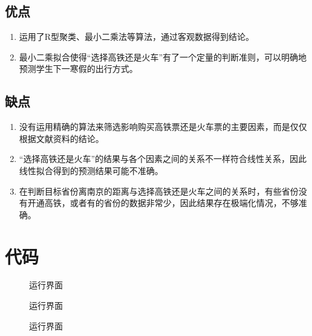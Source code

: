 \documentclass{ctexart}
\newcounter{sub}
\begin{document}
\subsection{优点}%
\label{sub:优点}
\begin{enumerate}
	\item 运用了R型聚类、最小二乘法等算法，通过客观数据得到结论。
	\item 最小二乘拟合使得\enquote{选择高铁还是火车}有了一个定量的判断准则，可以明确地预测学生下一寒假的出行方式。
\end{enumerate}

\subsection{缺点}%
\label{sub:缺点}
\begin{enumerate}
	\item 没有运用精确的算法来筛选影响购买高铁票还是火车票的主要因素，而是仅仅根据文献资料的结论。
	\item \enquote{选择高铁还是火车}的结果与各个因素之间的关系不一样符合线性关系，因此线性拟合得到的预测结果可能不准确。
	\item 在判断目标省份离南京的距离与选择高铁还是火车之间的关系时，有些省份没有开通高铁，或者有的省份的数据非常少，因此结果存在极端化情况，不够准确。
\end{enumerate}

\newpage






\renewcommand{\thesection}{\Alph{section}~}

\appendix

\section{代码}%
\label{sec:代码}


\begin{figure}[htpb]
	\centering
	\caption{运行界面}
	\label{fig:运行界面R.m}
\end{figure}


\begin{figure}[htpb]
	\centering
	\caption{运行界面}
	\label{fig:运行界面lsq.m}
\end{figure}


\begin{figure}[htpb]
	\centering
	\caption{运行界面}
	\label{fig:运行界面map.m}
\end{figure}


\printindex
\end{document}
